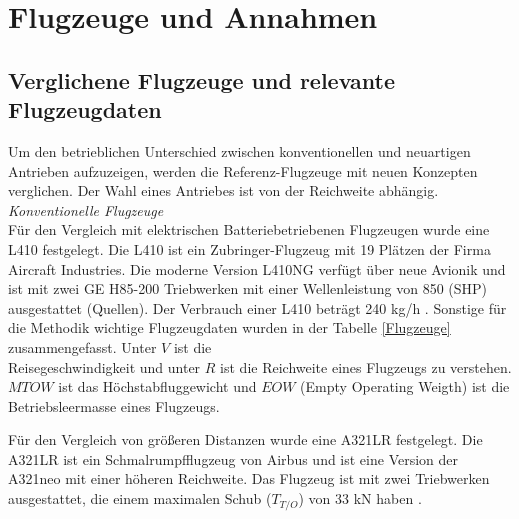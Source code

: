 \section{Flugzeuge und Annahmen}
\subsection{Verglichene Flugzeuge und relevante Flugzeugdaten}
\label{ss:Relevante Flugzeugdaten}
%
Um den betrieblichen Unterschied zwischen konventionellen und neuartigen Antrieben aufzuzeigen, 
werden die Referenz-Flugzeuge mit neuen Konzepten verglichen. 
Der Wahl eines Antriebes ist von der Reichweite abhängig.\\
%
\textit{Konventionelle Flugzeuge}\\
%
Für den Vergleich mit elektrischen Batteriebetriebenen Flugzeugen wurde eine L410 festgelegt. 
Die L410 ist ein Zubringer-Flugzeug mit 19 Plätzen der Firma Aircraft Industries. 
Die moderne Version L410NG verfügt über neue Avionik und ist mit zwei GE H85-200 Triebwerken 
mit einer Wellenleistung von 850 (SHP) ausgestattet (Quellen).
Der Verbrauch einer L410 beträgt 240 kg/h \cite{let2016l410}. 
Sonstige für die Methodik wichtige Flugzeugdaten wurden in der Tabelle \ref{Flugzeuge} zusammengefasst.
Unter $V$ ist die \\ Reisegeschwindigkeit und unter $R$ ist die Reichweite eines Flugzeugs zu verstehen. 
$MTOW$ ist das Höchstabfluggewicht und $EOW$ (Empty Operating Weigth) ist die Betriebsleermasse eines Flugzeugs.

Für den Vergleich von größeren Distanzen wurde eine A321LR festgelegt. 
Die A321LR ist ein Schmalrumpfflugzeug von Airbus und ist eine 
Version der A321neo mit einer höheren Reichweite.
Das Flugzeug ist mit zwei Triebwerken ausgestattet, 
die einem maximalen Schub ($T_{T/O}$) von 33 kN haben \cite{eurocontrol_a321}.

